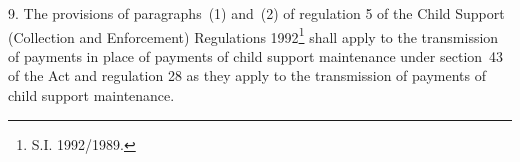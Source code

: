 \documentclass[12pt,a4paper]{article}
\begin{document}
%
%
%
%
%
%
%
%
%
%
%
%
%
%
%

9.  The provisions of paragraphs~(1) and~(2) of regulation 5 of the Child Support (Collection and Enforcement) Regulations 1992\footnote{\frenchspacing  S.I. 1992/1989.} shall apply to the transmission of payments in place of payments of child support maintenance under section~43 of the Act and regulation 28 as they apply to the transmission of payments of child support maintenance.
\end{document}
